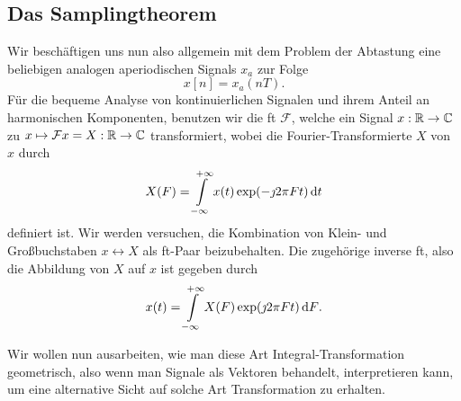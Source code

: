 \subsection{Das Samplingtheorem}\label{sec:sampling:sampling_theorem}
%
Wir beschäftigen uns nun also allgemein mit dem Problem der Abtastung eine beliebigen analogen aperiodischen Signals $x_a$ zur Folge
\[
    x[n] = x_a(nT).
\]
Für die bequeme Analyse von kontinuierlichen Signalen und ihrem Anteil an harmonischen Komponenten, benutzen wir die \gls{ft} $\mathcal{F}$, welche ein Signal $x : \mathbb{R} \rightarrow \mathbb{C}$ zu $x \mapsto \mathcal{F} x = X : \mathbb{R} \rightarrow \mathbb{C}$ transformiert, wobei die Fourier-Transformierte $X$ von $x$ durch
%
\begin{equation}\label{eq:sampling:fourier_trafo}
    X(F) = {\int\limits_{-\infty}^{+\infty}{x(t) \exp(-\jmath 2 \pi F t)}\,\mathrm{d}{t}}
\end{equation}
%
definiert ist.
Wir werden versuchen, die Kombination von Klein- und Großbuchstaben $x \leftrightarrow X$ als \gls{ft}-Paar beizubehalten.
Die zugehörige inverse \gls{ft}, also die Abbildung von $X$ auf $x$ ist gegeben durch
%
\begin{equation}\label{eq:inv_fourier_trafo}
    x(t) = {\int\limits_{-\infty}^{+\infty}{X(F) \exp(\jmath 2 \pi F t)}\,\mathrm{d}{F}}.
\end{equation}

Wir wollen nun ausarbeiten, wie man diese Art Integral-Transformation geometrisch, also wenn man Signale als Vektoren behandelt, interpretieren kann, um eine alternative Sicht auf solche Art Transformation zu erhalten.

